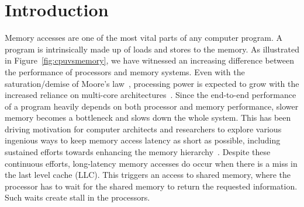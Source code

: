 \section{Introduction}
\label{sec:intro}
Memory accesses are one of the most vital parts of any computer program. A program is intrinsically made up of loads and stores to the memory. As illustrated in Figure~\ref{fig:cpuvsmemory}, we have witnessed an increasing difference between the performance of processors and memory systems.  Even with the saturation/demise of Moore's law~\cite{Wulf1995, waldrop2016, MooreMITR}, processing power is expected to grow with the increased reliance on multi-core architectures~\cite{Geer}. Since the end-to-end performance of a program heavily depends on both processor and memory performance, slower memory becomes a bottleneck and slows down the whole system. This has been driving motivation for computer architects and researchers to explore various ingenious ways to keep memory access latency as short as possible, including sustained efforts towards enhancing the memory hierarchy~\cite{Burger}. Despite these continuous efforts, long-latency memory accesses do occur when there is a miss in the last level cache (LLC). This triggers an access to shared memory, where the processor has to wait for the shared memory to return the requested information. Such waits create stall in the processors. 

